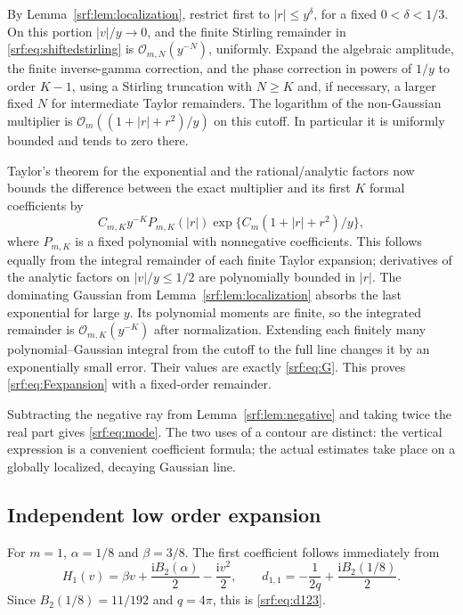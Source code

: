 \documentclass[11pt]{article}
\theoremstyle{remark}\newtheorem{remark}[theorem]{Remark}
\newcommand{\OO}{\mathcal O}
\newcommand{\ii}{\mathrm i}
\begin{document}
By Lemma~\ref{srf:lem:localization}, restrict first to $|r|\le y^\delta$, for a fixed $0<\delta<1/3$. On this portion $|v|/y\to0$, and the finite Stirling remainder in \eqref{srf:eq:shiftedstirling} is $\OO_{m,N}(y^{-N})$, uniformly. Expand the algebraic amplitude, the finite inverse-gamma correction, and the phase correction in powers of $1/y$ to order $K-1$, using a Stirling truncation with $N\ge K$ and, if necessary, a larger fixed $N$ for intermediate Taylor remainders. The logarithm of the non-Gaussian multiplier is $\OO_m((1+|r|+r^2)/y)$ on this cutoff. In particular it is uniformly bounded and tends to zero there.

Taylor's theorem for the exponential and the rational/analytic factors now bounds the difference between the exact multiplier and its first $K$ formal coefficients by
\[
 C_{m,K}y^{-K}P_{m,K}(|r|)
       \exp\{C_m(1+|r|+r^2)/y\},
\]
where $P_{m,K}$ is a fixed polynomial with nonnegative coefficients. This follows equally from the integral remainder of each finite Taylor expansion; derivatives of the analytic factors on $|v|/y\le1/2$ are polynomially bounded in $|r|$. The dominating Gaussian from Lemma~\ref{srf:lem:localization} absorbs the last exponential for large $y$. Its polynomial moments are finite, so the integrated remainder is $\OO_{m,K}(y^{-K})$ after normalization. Extending each finitely many polynomial--Gaussian integral from the cutoff to the full line changes it by an exponentially small error. Their values are exactly \eqref{srf:eq:G}. This proves \eqref{srf:eq:Fexpansion} with a fixed-order remainder.

Subtracting the negative ray from Lemma~\ref{srf:lem:negative} and taking twice the real part gives \eqref{srf:eq:mode}. The two uses of a contour are distinct: the vertical expression is a convenient coefficient formula; the actual estimates take place on a globally localized, decaying Gaussian line.

\subsection{Independent low order expansion}
For $m=1$, $\alpha=1/8$ and $\beta=3/8$. The first coefficient follows immediately from
\[
 H_1(v)=\beta v+\frac{\ii B_2(\alpha)}2-\frac{\ii v^2}2,
 \qquad d_{1,1}=-\frac1{2q}+\frac{\ii B_2(1/8)}2.
\]
Since $B_2(1/8)=11/192$ and $q=4\pi$, this is \eqref{srf:eq:d123}.
\end{document}
